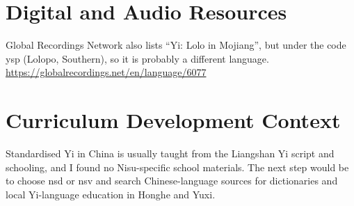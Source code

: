 \documentclass[12pt]{article}
\begin{document}
\section{Digital and Audio Resources}
Global Recordings Network also lists ``Yi: Lolo in Mojiang'', but under the code ysp (Lolopo, Southern), so it is probably a different language. \url{https://globalrecordings.net/en/language/6077}

\section{Curriculum Development Context}
Standardised Yi in China is usually taught from the Liangshan Yi script and schooling, and I found no Nisu-specific school materials. The next step would be to choose nsd or nsv and search Chinese-language sources for dictionaries and local Yi-language education in Honghe and Yuxi.
\end{document}
